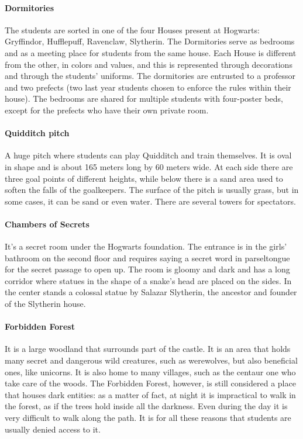 \paragraph{Dormitories}
The students are sorted in one of the four Houses present at Hogwarts: Gryffindor, Hufflepuff, Ravenclaw, Slytherin. The Dormitories serve as bedrooms and as a meeting place for students from the same house. Each House is different from the other, in colors and values, and this is represented through decorations and through the students' uniforms.  The dormitories are entrusted to a professor and two prefects (two last year students chosen to enforce the rules within their house). The bedrooms are shared for multiple students with four-poster beds, except for the prefects who have their own private room.

\paragraph{Quidditch pitch}
A huge pitch where students can play Quidditch and train themselves. It is oval in shape and is about 165 meters long by 60 meters wide. At each side there are three goal points of different heights, while below there is a sand area used to soften the falls of the goalkeepers. The surface of the pitch is usually grass, but in some cases, it can be sand or even water. There are several towers for spectators.

\paragraph{Chambers of Secrets}
It's a secret room under the Hogwarts foundation. The entrance is in the girls' bathroom on the second floor and requires saying a secret word in parseltongue for the secret passage to open up. The room is gloomy and dark and has a long corridor where statues in the shape of a snake's head are placed on the sides. In the center stands a colossal statue by Salazar Slytherin, the ancestor and founder of the Slytherin house.  

\paragraph{Forbidden Forest}
It is a large woodland that surrounds part of the castle. It is an area that holds many secret and dangerous wild creatures, such as werewolves, but also beneficial ones, like unicorns. It is also home to many villages, such as the centaur one who take care of the woods. The Forbidden Forest, however, is still considered a place that houses dark entities: as a matter of fact, at night it is impractical to walk in the forest, as if the trees hold inside all the darkness. Even during the day it is very difficult to walk along the path. It is for all these reasons that students are usually denied access to it. 


